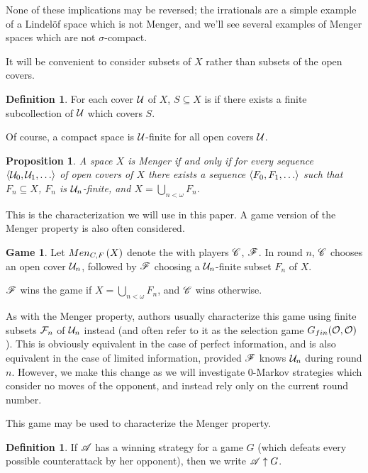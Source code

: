 \documentclass{amsart}
\newtheorem{proposition}[theorem]{Proposition}
\theoremstyle{definition}
\newtheorem{definition}[theorem]{Definition}
\newtheorem{game}[theorem]{Game}
\begin{document}
None of these implications may be reversed; the irrationals are a simple example
of a Lindel\"of space which is not Menger, and we'll see several examples of
Menger spaces which are not \(\sigma\)-compact.

It will be convenient to consider subsets of \(X\) rather than subsets of
the open covers.

\begin{definition}
  For each cover \(\mathcal{U}\) of \(X\), \(S\subseteq X\) is
   if
  there exists a finite subcollection of \(\mathcal{U}\) which covers \(S\).
\end{definition}

Of course, a compact space is \(\mathcal{U}\)-finite for all open covers \(\mathcal{U}\).

\begin{proposition}
  A space \(X\) is Menger if and only if
  for every sequence \(\<\mc U_0,\mc U_1,\dots\>\)
  of open covers of \(X\) there exists a sequence
  \(\<F_0,F_1,\dots\>\) such that \(F_n\subseteq X\), \(F_n\) is
  \(\mathcal{U}_n\)-finite, and \(X=\bigcup_{n<\omega}F_n\).
\end{proposition}

This is the characterization we will use in this paper.
A game version of the Menger property is also often considered.

\begin{game}
  Let \(Men_{C,F}\left({X}\right)\) denote the  with players \(\mathscr{C}\), \(\mathscr{F}\).
  In round \(n\), \(\mathscr{C}\) chooses an open cover \(\mathcal{U}_n\), followed by \(\mathscr{F}\)
  choosing a \(\mathcal{U}_n\)-finite subset \(F_n\) of \(X\).

  \(\mathscr{F}\) wins the game if \(X = \bigcup_{n<\omega}F_n\),
  and \(\mathscr{C}\) wins otherwise.
\end{game}

As with the Menger property, authors usually characterize this game using
finite subsets \(\mathcal{F}_n\)
of \(\mathcal{U}_n\) instead (and often refer to it as the selection game
\(G_{fin}(\mathcal{O},\mathcal{O})\)).
This is obviously equivalent in the case of perfect
information, and is also equivalent
in the case of limited information, provided \(\mathscr{F}\)
knows \(\mathcal{U}_n\) during round \(n\). However, we make this change as we
will investigate \(0\)-Markov strategies which consider no moves of
the opponent, and instead rely only on the current round number.

This game may be used to characterize the Menger property.

\begin{definition}
  If \(\mathscr{A}\) has a winning strategy for a game \(G\) (which defeats every
  possible counterattack by her opponent), then we write \(\mathscr{A}\uparrow G\).
\end{definition}
\end{document}
